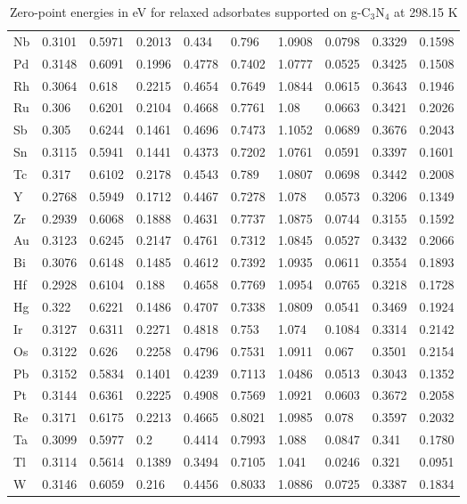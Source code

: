 \begin{table}[h]
{\begin{tabular}{*{10}{l}}
    Nb & 0.3101 & 0.5971 & 0.2013 & 0.434  & 0.796  & 1.0908 & 0.0798 & 0.3329 & 0.1598 \\
    Pd & 0.3148 & 0.6091 & 0.1996 & 0.4778 & 0.7402 & 1.0777 & 0.0525 & 0.3425 & 0.1508 \\
    Rh & 0.3064 & 0.618  & 0.2215 & 0.4654 & 0.7649 & 1.0844 & 0.0615 & 0.3643 & 0.1946 \\
    Ru & 0.306  & 0.6201 & 0.2104 & 0.4668 & 0.7761 & 1.08   & 0.0663 & 0.3421 & 0.2026 \\
    Sb & 0.305  & 0.6244 & 0.1461 & 0.4696 & 0.7473 & 1.1052 & 0.0689 & 0.3676 & 0.2043 \\
    Sn & 0.3115 & 0.5941 & 0.1441 & 0.4373 & 0.7202 & 1.0761 & 0.0591 & 0.3397 & 0.1601 \\
    Tc & 0.317  & 0.6102 & 0.2178 & 0.4543 & 0.789  & 1.0807 & 0.0698 & 0.3442 & 0.2008 \\
    Y  & 0.2768 & 0.5949 & 0.1712 & 0.4467 & 0.7278 & 1.078  & 0.0573 & 0.3206 & 0.1349 \\
    Zr & 0.2939 & 0.6068 & 0.1888 & 0.4631 & 0.7737 & 1.0875 & 0.0744 & 0.3155 & 0.1592 \\
    Au & 0.3123 & 0.6245 & 0.2147 & 0.4761 & 0.7312 & 1.0845 & 0.0527 & 0.3432 & 0.2066 \\
    Bi & 0.3076 & 0.6148 & 0.1485 & 0.4612 & 0.7392 & 1.0935 & 0.0611 & 0.3554 & 0.1893 \\
    Hf & 0.2928 & 0.6104 & 0.188  & 0.4658 & 0.7769 & 1.0954 & 0.0765 & 0.3218 & 0.1728 \\
    Hg & 0.322  & 0.6221 & 0.1486 & 0.4707 & 0.7338 & 1.0809 & 0.0541 & 0.3469 & 0.1924 \\
    Ir & 0.3127 & 0.6311 & 0.2271 & 0.4818 & 0.753  & 1.074  & 0.1084 & 0.3314 & 0.2142 \\
    Os & 0.3122 & 0.626  & 0.2258 & 0.4796 & 0.7531 & 1.0911 & 0.067  & 0.3501 & 0.2154 \\
    Pb & 0.3152 & 0.5834 & 0.1401 & 0.4239 & 0.7113 & 1.0486 & 0.0513 & 0.3043 & 0.1352 \\
    Pt & 0.3144 & 0.6361 & 0.2225 & 0.4908 & 0.7569 & 1.0921 & 0.0603 & 0.3672 & 0.2058 \\
    Re & 0.3171 & 0.6175 & 0.2213 & 0.4665 & 0.8021 & 1.0985 & 0.078  & 0.3597 & 0.2032 \\
    Ta & 0.3099 & 0.5977 & 0.2    & 0.4414 & 0.7993 & 1.088  & 0.0847 & 0.341  & 0.1780 \\
    Tl & 0.3114 & 0.5614 & 0.1389 & 0.3494 & 0.7105 & 1.041  & 0.0246 & 0.321  & 0.0951 \\
    W  & 0.3146 & 0.6059 & 0.216  & 0.4456 & 0.8033 & 1.0886 & 0.0725 & 0.3387 & 0.1834 \\
    \hline
  \end{tabular}
  }
  \caption{Zero-point energies in eV for relaxed adsorbates supported on g-C$_3$N$_4$ at 298.15 K}
  \label{si_table7}
\end{table}


